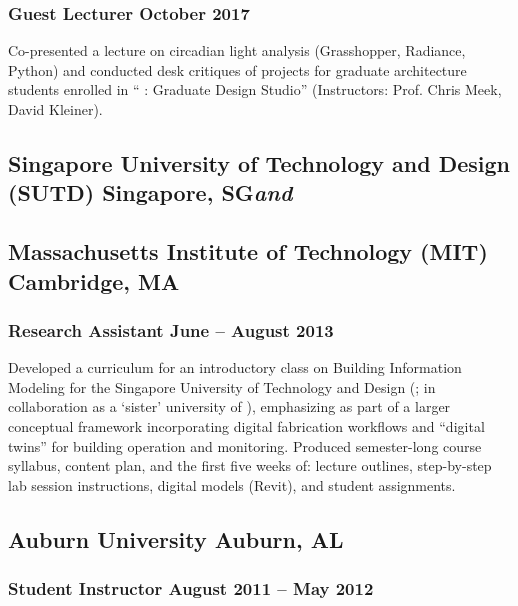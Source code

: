 \documentclass[letterpaper, oneside, 10pt]{article}
\begin{document}
\setlength{\pagetotal}{\pagetotal - 3em}

\subsubsection*{Guest Lecturer\DotSep{0.25em} October 2017}

Co-presented a lecture on circadian light analysis (Grasshopper, Radiance,
Python) and conducted desk critiques of projects for graduate architecture
students enrolled in `` : Graduate Design Studio''
(Instructors: Prof. Chris Meek, David Kleiner).

\subsection*{%
  Singapore University of Technology and Design (SUTD)%
  \DotSep{0.25em} Singapore, SG\DotSep{0.25em}\textit{and}%
}
\subsection*{%
  Massachusetts Institute of Technology (MIT)\DotSep{0.25em} Cambridge, MA%
}

\subsubsection*{Research Assistant\DotSep{0.25em} June -- August 2013}

Developed a curriculum for an introductory class on Building Information
Modeling  for the Singapore University of Technology and Design
(; in collaboration as a `sister' university of ), emphasizing
 as part of a larger conceptual framework incorporating digital
fabrication workflows and ``digital twins'' for building operation and
monitoring. Produced semester-long course syllabus, content plan, and the
first five weeks of: lecture outlines, step-by-step lab session instructions,
digital models (Revit), and student assignments.


\subsection*{Auburn University\DotSep{0.25em} Auburn, AL}

\subsubsection*{Student Instructor\DotSep{0.25em} August 2011 -- May 2012}
\end{document}
